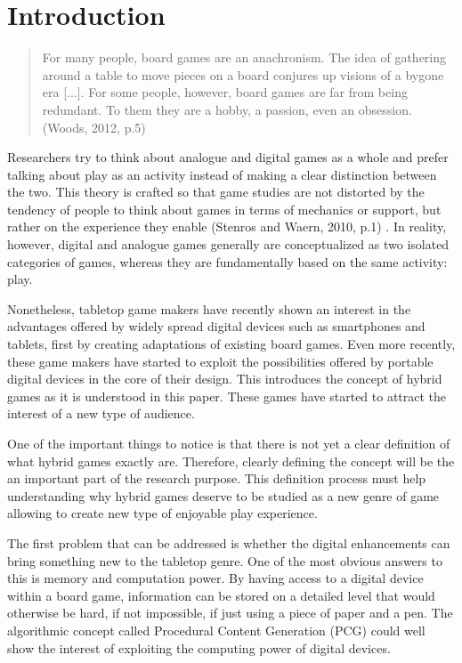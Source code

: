 \chapter{Introduction}
\begin{quotation}
For many people, board games are an anachronism. The idea of gathering around a table to move pieces on a board conjures up visions of a bygone era [...]. For some people, however, board games are far from being redundant. To them they are a hobby, a passion, even an obsession. (Woods, 2012, p.5) \cite{book:euro}
\end{quotation}

Researchers try to think about analogue and digital games as a whole and prefer talking about play as an activity instead of making a clear distinction between the two. This theory is crafted so that game studies are not distorted by the tendency of people to think about games in terms of mechanics or support, but rather on the experience they enable (Stenros and Waern, 2010, p.1) \cite{art:stenroswaern}. In reality, however, digital and analogue games generally are conceptualized as two isolated categories of games, whereas they are fundamentally based on the same activity: play. 

Nonetheless, tabletop game makers have recently shown an interest in the advantages offered by widely spread digital devices such as smartphones and tablets, first by creating adaptations of existing board games. Even more recently, these game makers have started to exploit the possibilities offered by portable digital devices in the core of their design. This introduces the concept of hybrid games as it is understood in this paper. These games have started to attract the interest of a new type of audience.

One of the important things to notice is that there is not yet a clear definition of what hybrid games exactly are. Therefore, clearly defining the concept will be the an important part of the research purpose. This definition process must help understanding why hybrid games deserve to be studied as a new genre of game allowing to create new type of enjoyable play experience. 

The first problem that can be addressed is whether the digital enhancements can bring something new to the tabletop genre. One of the most obvious answers to this is memory and computation power. By having access to a digital device within a board game, information can be stored on a detailed level that would otherwise be hard, if not impossible, if just using a piece of paper and a pen. The algorithmic concept called Procedural Content Generation (PCG) could well show the interest of exploiting the computing power of digital devices. 

